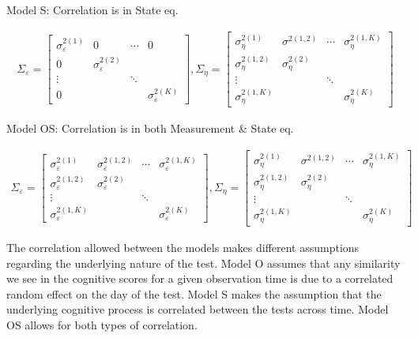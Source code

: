 \documentclass[
]{article}
\begin{document}
Model S: Correlation is in State eq.

\begin{equation*}
\begin{aligned}
\Sigma_\varepsilon = 
\begin{bmatrix}
\sigma^{2(1)}_\varepsilon & 0 & \cdots & 0\\
0 & \sigma^{2(2)}_\varepsilon\\
\vdots & & \ddots\\
0 & & &\sigma^{2(K)}_\varepsilon
\end{bmatrix},
\Sigma_\eta =
\begin{bmatrix}
\sigma^{2(1)}_\eta & \sigma^{2(1,2)} & \cdots & \sigma^{2(1, K)}_\eta\\
\sigma^{2(1,2)}_\eta & \sigma^{2(2)}_\eta\\
\vdots & & \ddots\\
\sigma^{2(1, K)}_\eta & & &\sigma^{2(K)}_\eta
\end{bmatrix}
\end{aligned}
\end{equation*}

Model OS: Correlation is in both Measurement \& State eq.

\begin{equation*}
\begin{aligned}
\Sigma_\varepsilon = 
\begin{bmatrix}
\sigma^{2(1)}_\varepsilon & \sigma^{2(1,2)}_\varepsilon & \cdots & \sigma^{2(1, K)}_\varepsilon\\
\sigma^{2(1,2)}_\varepsilon & \sigma^{2(2)}_\varepsilon\\
\vdots & & \ddots\\
\sigma^{2(1, K)}_\varepsilon & & &\sigma^{2(K)}_\varepsilon
\end{bmatrix},
\Sigma_\eta =
\begin{bmatrix}
\sigma^{2(1)}_\eta & \sigma^{2(1,2)} & \cdots & \sigma^{2(1, K)}_\eta\\
\sigma^{2(1,2)}_\eta & \sigma^{2(2)}_\eta\\
\vdots & & \ddots\\
\sigma^{2(1, K)}_\eta & & &\sigma^{2(K)}_\eta
\end{bmatrix}
\end{aligned}
\end{equation*}

The correlation allowed between the models makes different assumptions regarding the underlying nature of the test. Model O assumes that any similarity we see in the cognitive scores for a given observation time is due to a correlated random effect on the day of the test. Model S makes the assumption that the underlying cognitive process is correlated between the tests across time. Model OS allows for both types of correlation.
\end{document}
